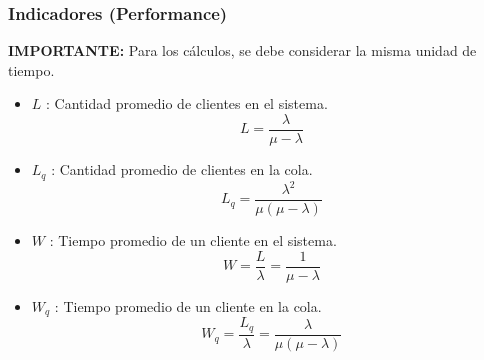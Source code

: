 \documentclass{templateNote}
\begin{document}
\newpage
\subsubsection{Indicadores (Performance)}
\textbf{IMPORTANTE:} Para los cálculos, se debe considerar la misma unidad de tiempo.
\begin{itemize}
    \item $L$ : Cantidad promedio de clientes en el sistema.
    \begin{equation*}
        L = \frac{\lambda}{\mu - \lambda}
    \end{equation*}

    \item $L_q$ : Cantidad promedio de clientes en la cola.
    \begin{equation*}
        L_q = \frac{\lambda^2}{\mu(\mu - \lambda)}
    \end{equation*}

    \item $W$ : Tiempo promedio de un cliente en el sistema.
    \begin{equation*}
        W = \frac{L}{\lambda} = \frac{1}{\mu - \lambda}
    \end{equation*}

    \item $W_q$ : Tiempo promedio de un cliente en la cola.
    \begin{equation*}
        W_q = \frac{L_q}{\lambda} = \frac{\lambda}{\mu(\mu - \lambda)}
    \end{equation*}
\end{itemize}
\end{document}
